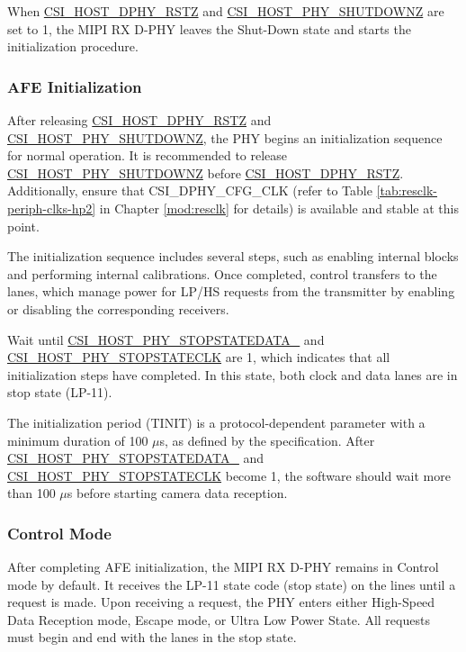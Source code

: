 \documentclass[main\_\_EN.tex]{subfiles}
\begin{document}
When \hyperref[fielddesc:CSIHOSTDPHYRSTZ]{CSI\_HOST\_DPHY\_RSTZ} and \hyperref[fielddesc:CSIHOSTPHYSHUTDOWNZ] {CSI\_HOST\_PHY\_SHUTDOWNZ} are set to 1, the MIPI RX D-PHY leaves the Shut-Down state and starts the initialization procedure.

\subsubsection{AFE Initialization}

After releasing \hyperref[fielddesc:CSIHOSTDPHYRSTZ]{CSI\_HOST\_DPHY\_RSTZ} and \hyperref[fielddesc:CSIHOSTPHYSHUTDOWNZ]{CSI\_HOST\_PHY\_SHUTDOWNZ}, the PHY begins an initialization sequence for normal operation. It is recommended to release \hyperref[fielddesc:CSIHOSTPHYSHUTDOWNZ] {CSI\_HOST\_PHY\_SHUTDOWNZ} before \hyperref[fielddesc:CSIHOSTDPHYRSTZ]{CSI\_HOST\_DPHY\_RSTZ}. Additionally, ensure that CSI\_DPHY\_CFG\_CLK (refer to Table \ref{tab:resclk-periph-clks-hp2} in Chapter \ref{mod:resclk} \textit{} for details) is available and stable at this point.

The initialization sequence includes several steps, such as enabling internal blocks and performing internal calibrations. Once completed, control transfers to the lanes, which manage power for LP/HS requests from the transmitter by enabling or disabling the corresponding receivers.

Wait until \hyperref[fielddesc:CSIHOSTPHYSTOPSTATEDATA0]{CSI\_HOST\_PHY\_STOPSTATEDATA\_} and \hyperref[fielddesc:CSIHOSTPHYSTOPSTATECLK]{CSI\_HOST\_PHY\_STOPSTATECLK} are 1, which indicates that all initialization steps have completed. In this state, both clock and data lanes are in stop state (LP-11).

The initialization period (TINIT) is a protocol-dependent parameter with a minimum duration of 100 $\mu$s, as defined by the specification. After \hyperref[fielddesc:CSIHOSTPHYSTOPSTATEDATA0]{CSI\_HOST\_PHY\_STOPSTATEDATA\_} and \hyperref[fielddesc:CSIHOSTPHYSTOPSTATECLK]{CSI\_HOST\_PHY\_STOPSTATECLK} become 1, the software should wait more than 100 $\mu$s before starting camera data reception.

\subsubsection{Control Mode}

After completing AFE initialization, the MIPI RX D-PHY remains in Control mode by default. It receives the LP-11 state code (stop state) on the lines until a request is made. Upon receiving a request, the PHY enters either High-Speed Data Reception mode, Escape mode, or Ultra Low Power State. All requests must begin and end with the lanes in the stop state.
\end{document}
